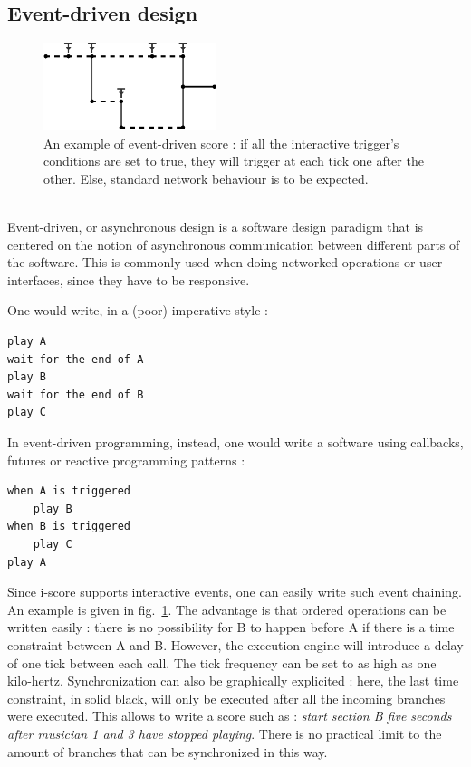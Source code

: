 \documentclass{article}
\begin{document}
\subsection{Event-driven design}
\begin{figure}[h]
    \centering
    \includegraphics[width=0.45\textwidth]{images/event.eps}
    \caption{An example of event-driven score : if all the interactive trigger's conditions are set to true, they will trigger at each tick one after the other. Else, standard network behaviour is to be expected.}
    \label{fig.event}
\end{figure}~\\
Event-driven, or asynchronous design is a software design 
paradigm that is centered on the notion of asynchronous 
communication between different parts of the software.
This is commonly used when doing networked operations or 
user interfaces, since they have to be responsive.

One would write, in a (poor) imperative style : 
\begin{lstlisting}
play A
wait for the end of A
play B
wait for the end of B
play C
\end{lstlisting}
In event-driven programming, instead, one would write a software 
using callbacks, futures or reactive programming patterns\cite{kambona2013evaluation} :~\\
\begin{lstlisting}
when A is triggered
    play B
when B is triggered
    play C    
play A
\end{lstlisting}

Since i-score supports interactive events, one can easily write such event chaining.
An example is given in fig.~\ref{fig.event}. 
The advantage is that ordered operations can be written easily : there is no 
possibility for B to happen before A if there is a time constraint between A and B.
However, the execution engine will introduce a delay of one tick between each call.
The tick frequency can be set to as high as one kilo-hertz.
Synchronization can also be graphically explicited : here, the last time constraint, in solid black, will 
only be executed after all the incoming branches were executed. 
This allows to write a score such as : \emph{start section B five seconds after musician 1 and 3 
have stopped playing}.
There is no practical limit to the amount of branches that can be synchronized in this way.
\end{document}
